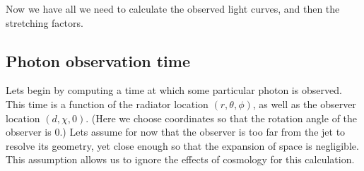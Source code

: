 \documentclass{article}
\begin{document}
Now we have all we need to calculate the observed light curves, and then the stretching factors.

\subsection{Photon observation time}

Lets begin by computing a time at which some particular photon is observed. This time is a function of the radiator location $\left(r, \theta, \phi\right)$, as well as the observer location $\left(d, \chi, 0\right)$. (Here we choose coordinates so that the rotation angle of the observer is $0$.) Lets assume for now that the observer is too far from the jet to resolve its geometry, yet close enough so that the expansion of space is negligible. This assumption allows us to ignore the effects of cosmology for this calculation.
\end{document}
